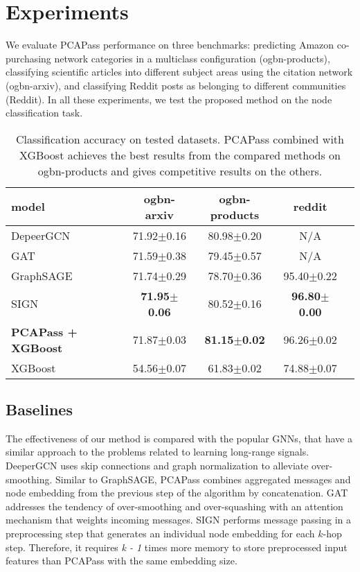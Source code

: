 \documentclass[nohyperref]{article}
\theoremstyle{plain}
\theoremstyle{definition}
\theoremstyle{remark}
\begin{document}
\section{Experiments}
We evaluate PCAPass performance on three benchmarks: predicting Amazon co-purchasing network categories in a multiclass configuration (ogbn-products), classifying scientific articles into different subject areas using the citation network (ogbn-arxiv), and classifying Reddit posts as belonging to different communities (Reddit). In all these experiments, we test the proposed method on the node classification task.
\begin{table}[H]
    \centering
    \caption{Classification accuracy on tested datasets. 
    PCAPass combined with XGBoost achieves the best results from the compared methods on ogbn-products and gives competitive results on the others.}
    \label{accuracy-table}
\vskip 0.15in
    \begin{center}
    \begin{small}
    \begin{sc}
    \fontsize{6.5}{7}\selectfont
    \begin{tabular}{p{2.4cm} cccc}
    \toprule
    \textbf{model} & \textbf{ogbn-arxiv} & \textbf{ogbn-products} & \textbf{reddit} \\
    \midrule
    DepeerGCN&71.92$\pm$0.16&80.98$\pm$0.20&N/A\\
    GAT&71.59$\pm$0.38&79.45$\pm$0.57&N/A\\
    GraphSAGE&71.74$\pm$0.29&78.70$\pm$0.36&95.40$\pm$0.22\\
    SIGN&\textbf{71.95$\pm$0.06}&80.52$\pm$0.16&\textbf{96.80$\pm$0.00}\\
    \textbf{PCAPass + XGBoost}&71.87$\pm$0.03&\textbf{81.15$\pm$0.02}&96.26$\pm$0.02\\
    XGBoost&54.56$\pm$0.07&61.83$\pm$0.02&74.88$\pm$0.07\\
    \bottomrule
    \end{tabular}
    \end{sc}
    \end{small}
    \end{center}
    \vskip -0.1in
    \end{table}

\subsection{Baselines}
The effectiveness of our method is compared with the popular GNNs, that have a similar approach to the problems related to learning long-range signals.
DeeperGCN uses skip connections and graph normalization to alleviate over-smoothing. 
Similar to GraphSAGE, PCAPass combines aggregated messages and node embedding from the previous step of the algorithm by concatenation. 
GAT addresses the tendency of over-smoothing \cite{min2022scattering} and over-squashing \cite{alon2021bottleneck} with an attention mechanism that weights incoming messages. 
SIGN performs message passing in a preprocessing step that generates an individual node embedding for each $k$-hop step. 
Therefore, it requires \textit{k - 1} times more memory to store preprocessed input features than PCAPass with the same embedding size.
\end{document}
